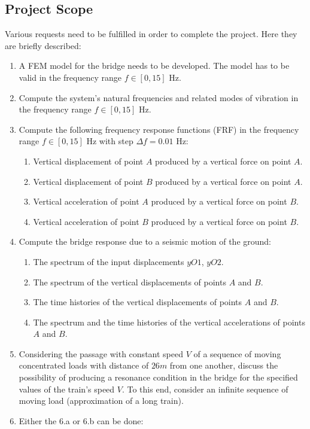 \documentclass[10pt,a4paper,final]{report}
\begin{document}
\subsection{Project Scope}
Various requests need to be fulfilled in order to complete the project. Here they are briefly described:
\begin{enumerate}
\item A FEM model for the bridge needs to be developed. The model has to be valid in the frequency range $f \in [0,15]$ Hz.
\item Compute the system’s natural frequencies and related modes of vibration in the frequency range $f \in [0,15]$ Hz.
\item { Compute the following frequency response functions (FRF) in the frequency range $f \in [0,15]$ Hz with step $\Delta f = 0.01$ Hz:
\begin{enumerate}
\item Vertical displacement of point $A$ produced by a vertical force on point $A$.
\item Vertical displacement of point $B$ produced by a vertical force on point $A$.
\item Vertical acceleration of point $A$ produced by a vertical force on point $B$.
\item Vertical acceleration of point $B$ produced by a vertical force on point $B$.
\end{enumerate}
}
\item {Compute the bridge response due to a seismic motion of the ground:
\begin{enumerate}
\item The spectrum of the input displacements $yO1$, $yO2$.
\item The spectrum of the vertical displacements of points $A$ and $B$.
\item The time histories of the vertical displacements of points $A$ and $B$.
\item The spectrum and the time histories of the vertical accelerations of points $A$ and $B$.
\end{enumerate}
}
\item {Considering the passage with constant speed $V$ of a sequence of moving concentrated loads with distance of $26 m$ from one another, discuss the possibility of producing a resonance condition in the bridge for the specified values of the train's speed $V$. To this end, consider an infinite sequence of moving load (approximation of a long train).}
\item {Either the 6.a or 6.b can be done:
}
\end{enumerate}
\end{document}
